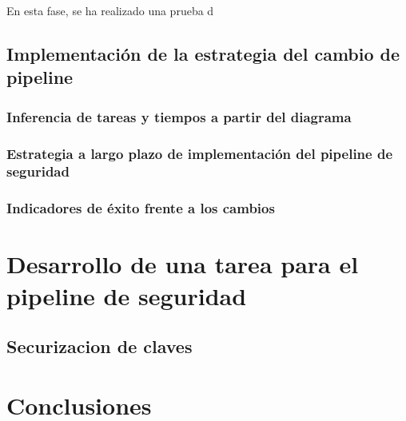 \documentclass[12pt]{report} %
\begin{document}
En esta fase, se ha realizado una prueba d


\section{Implementación de la estrategia del cambio de pipeline}

\subsection{Inferencia de tareas y tiempos a partir del diagrama}

\subsection{Estrategia a largo plazo de implementación del pipeline de
seguridad}

\subsection{Indicadores de éxito frente a los cambios}

\chapter{Desarrollo de una tarea para el pipeline de seguridad}

\section{Securizacion de claves}







\chapter{Conclusiones}
\end{document}
